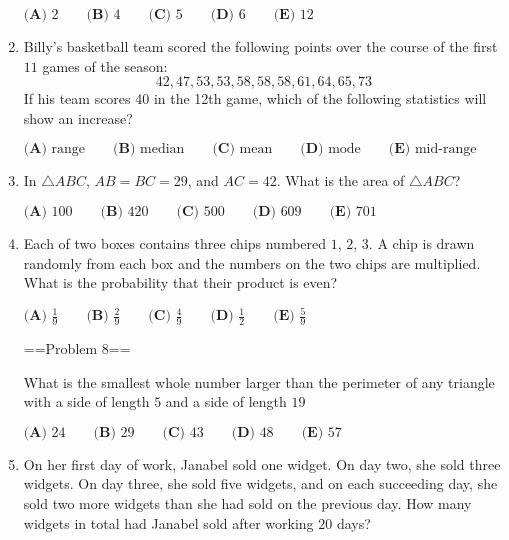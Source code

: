 \documentclass{article}
\begin{document}
\begin{enumerate}[label=\arabic*., itemsep=0.5em]
\(\textbf{(A) }2\qquad\textbf{(B) }4\qquad\textbf{(C) }5\qquad\textbf{(D) }6\qquad \textbf{(E) }12\)\par \vspace{0.5em}\item Billy's basketball team scored the following points over the course of the first \(11\) games of the season: 
\begin{equation*}
42, 47, 53, 53, 58, 58, 58, 61, 64, 65, 73
\end{equation*}
 If his team scores 40 in the 12th game, which of the following statistics will show an increase?

\(\textbf{(A) } \text{range} \qquad \textbf{(B) } \text{median} \qquad \textbf{(C) } \text{mean} \qquad \textbf{(D) } \text{mode} \qquad \textbf{(E) } \text{mid-range}\)\par \vspace{0.5em}\item In \(\triangle ABC\), \(AB=BC=29\), and \(AC=42\). What is the area of \(\triangle ABC\)?

\(\textbf{(A) }100\qquad\textbf{(B) }420\qquad\textbf{(C) }500\qquad\textbf{(D) }609\qquad \textbf{(E) }701\)\par \vspace{0.5em}\item Each of two boxes contains three chips numbered \(1\), \(2\), \(3\). A chip is drawn randomly from each box and the numbers on the two chips are multiplied. What is the probability that their product is even?

\(\textbf{(A) }\frac{1}{9}\qquad\textbf{(B) }\frac{2}{9}\qquad\textbf{(C) }\frac{4}{9}\qquad\textbf{(D) }\frac{1}{2}\qquad \textbf{(E) }\frac{5}{9}\)



==Problem 8== 

What is the smallest whole number larger than the perimeter of any triangle with a side of length \(5\) and a side of length \(19\)

\(\textbf{(A) }24\qquad\textbf{(B) }29\qquad\textbf{(C) }43\qquad\textbf{(D) }48\qquad \textbf{(E) }57\)\par \vspace{0.5em}\item On her first day of work, Janabel sold one widget. On day two, she sold three widgets. On day three, she sold five widgets, and on each succeeding day, she sold two more widgets than she had sold on the previous day. How many widgets in total had Janabel sold after working \(20\) days?


\end{enumerate}
\end{document}
